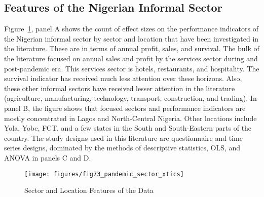 \documentclass[12pt, english]{article}
\begin{document}
    \subsection{Features of the Nigerian Informal Sector}\label{subsec4.1:features-of-the-informal-sector}
    Figure~\ref{fig2:pandemic-sector-xtics}, panel A shows the count of effect sizes on the performance indicators of the Nigerian informal sector by sector and location that have been investigated in the literature. These are in terms of annual profit, sales, and survival. The bulk of the literature focused on annual sales and profit by the services sector during and post-pandemic era. This services sector is hotels, restaurants, and hospitality. The survival indicator has received much less attention over these horizons. Also, these other informal sectors have received lesser attention in the literature (agriculture, manufacturing, technology, transport, construction, and trading). In panel B, the figure shows that focused sectors and performance indicators are mostly concentrated in Lagos and North-Central Nigeria. Other locations include Yola, Yobe, FCT, and a few states in the South and South-Eastern parts of the country. The study designs used in this literature are questionnaire and time series designs, dominated by the methods of descriptive statistics, OLS, and ANOVA in panels C and D.

    \begin{figure}[H]
        \centering
        \texttt{[image: figures/fig73\_pandemic\_sector\_xtics]}
        \caption{Sector and Location Features of the Data}
        \label{fig2:pandemic-sector-xtics}
    \end{figure}
%
\end{document}
